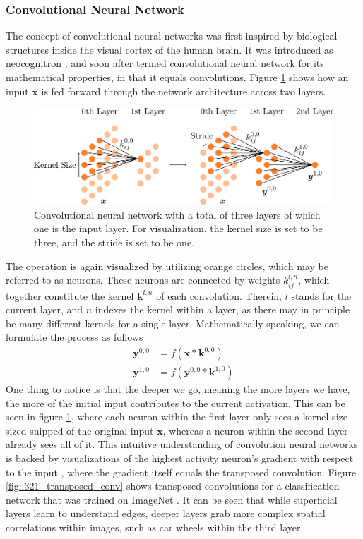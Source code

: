 \subsubsection{Convolutional Neural Network}
The concept of convolutional neural networks was first inspired by biological structures inside the visual cortex of the human brain. It was introduced as neocognitron \cite{fukushima1980neocognitron}, and soon after termed convolutional neural network for its mathematical properties, in that it equals convolutions. Figure \ref{fig::321_convolutional} shows how an input $\bm{x}$ is fed forward through the network architecture across two layers.   
\begin{figure}[h]
	\centering
	\includegraphics[scale=.28]{chapters/03_background/img/convolutional.png}
	\caption{Convolutional neural network with a total of three layers of which one is the input layer. For visualization, the kernel size is set to be three, and the stride is set to be one.}
	\label{fig::321_convolutional}
\end{figure}
The operation is again visualized by utilizing orange circles, which may be referred to as neurons. These neurons are connected by weights $k^{l,n}_{ij}$, which together constitute the kernel $\bm{k}^{l,n}$ of each convolution. Therein, $l$ stands for the current layer, and $n$ indexes the kernel within a layer, as there may in principle be many different kernels for a single layer. Mathematically speaking, we can formulate the process as follows
\begin{align}
	\bm{y}^{0,0} &= f(\bm{x}*\bm{k}^{0,0}) \\
	\bm{y}^{1,0} &= f(\bm{y}^{0,0}*\bm{k}^{1,0})	
\end{align}
One thing to notice is that the deeper we go, meaning the more layers we have, the more of the initial input contributes to the current activation. This can be seen in figure \ref{fig::321_convolutional}, where each neuron within the first layer only sees a kernel size sized snipped of the original input $\bm{x}$, whereas a neuron within the second layer already sees all of it. This intuitive understanding of convolution neural networks is backed by visualizations of the highest activity neuron's gradient with respect to the input \cite{zeiler2014visualizing}, where the gradient itself equals the transposed convolution.  Figure \ref{fig::321_transposed_conv} shows transposed convolutions for a classification network that was trained on ImageNet \cite{deng2009imagenet}. It can be seen that while superficial layers learn to understand edges, deeper layers grab more complex spatial correlations within images, such as car wheels within the third layer.
